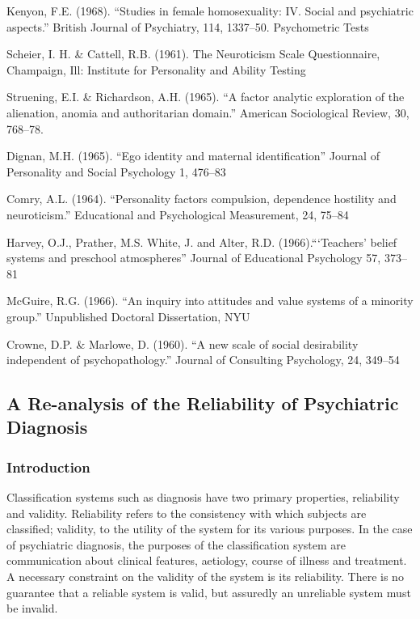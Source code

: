 Kenyon, F.E. (1968). ``Studies in female homosexuality: IV. Social and psychiatric aspects.'' British Journal of Psychiatry, 114, 1337--50.
Psychometric Tests

Scheier, I. H. \& Cattell, R.B. (1961). The Neuroticism Scale Questionnaire, Champaign, Ill: Institute for Personality and Ability Testing

Struening, E.I. \& Richardson, A.H. (1965). ``A factor analytic exploration of the alienation, anomia and authoritarian domain.'' American Sociological Review, 30, 768--78.

Dignan, M.H. (1965). ``Ego identity and maternal identification'' Journal of Personality and Social Psychology 1, 476--83

Comry, A.L. (1964). ``Personality factors compulsion, dependence hostility and neuroticism.'' Educational and Psychological Measurement, 24, 75--84

Harvey, O.J., Prather, M.S. White, J. and Alter, R.D. (1966).```Teachers' belief systems and preschool atmospheres'' Journal of Educational Psychology 57, 373--81

McGuire, R.G. (1966). ``An inquiry into attitudes and value systems of a minority group.'' Unpublished Doctoral Dissertation, NYU

Crowne, D.P. \& Marlowe, D. (1960). ``A new scale of social desirability independent of psychopathology.'' Journal of Consulting Psychology, 24, 349--54

\newpage

\subsection{A Re-analysis of the Reliability of Psychiatric Diagnosis}
\label{are-analysisofthereliabilityofpsychiatricdiagnosis}

\subsubsection{Introduction}
\label{introduction}

Classification systems such as diagnosis have two primary properties, reliability and validity. Reliability refers to the consistency with which subjects are classified; validity, to the utility of the system for its various purposes. In the case of psychiatric diagnosis, the purposes of the classification system are communication about clinical features, aetiology, course of illness and treatment. A necessary constraint on the validity of the system is its reliability. There is no guarantee that a reliable system is valid, but assuredly an unreliable system must be invalid.

